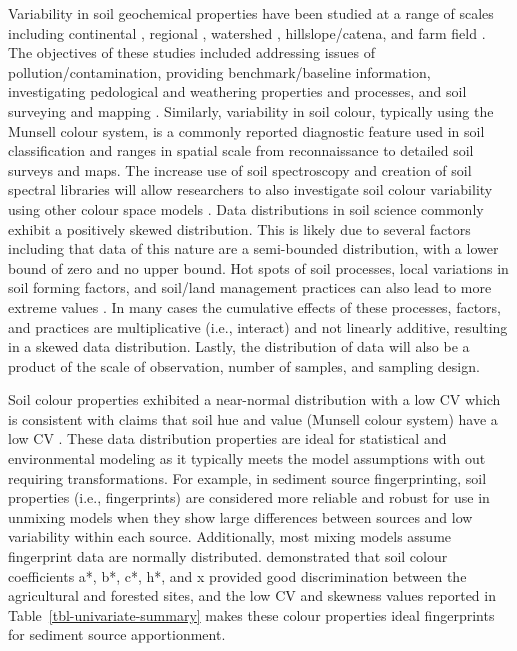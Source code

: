 \documentclass[
  number]{elsarticle}
\begin{document}
Variability in soil geochemical properties have been studied at a range
of scales including continental \citep{drew2010}, regional
\citep{rattenbury2018}, watershed \citep{nanos2012}, hillslope/catena,
and farm field \citep{sun2021a}. The objectives of these studies
included addressing issues of pollution/contamination, providing
benchmark/baseline information, investigating pedological and weathering
properties and processes, and soil surveying and mapping
\citep{wilson2008}. Similarly, variability in soil colour, typically
using the Munsell colour system, is a commonly reported diagnostic
feature used in soil classification and ranges in spatial scale from
reconnaissance to detailed soil surveys and maps. The increase use of
soil spectroscopy \citep{poppiel2022} and creation of soil spectral
libraries \citep[e.g.,][]{canadian} will allow researchers to also
investigate soil colour variability using other colour space models
\citep{viscarrarossel2006}. Data distributions in soil science commonly
exhibit a positively skewed distribution. This is likely due to several
factors including that data of this nature are a semi-bounded
distribution, with a lower bound of zero and no upper bound. Hot spots
of soil processes, local variations in soil forming factors, and
soil/land management practices can also lead to more extreme values
\citep[e.g.,][]{vidon2010}. In many cases the cumulative effects of
these processes, factors, and practices are multiplicative (i.e.,
interact) and not linearly additive, resulting in a skewed data
distribution. Lastly, the distribution of data will also be a product of
the scale of observation, number of samples, and sampling design.

Soil colour properties exhibited a near-normal distribution with a low
CV which is consistent with claims that soil hue and value (Munsell
colour system) have a low CV \citep{pennock2008}. These data
distribution properties are ideal for statistical and environmental
modeling as it typically meets the model assumptions with out requiring
transformations. For example, in sediment source fingerprinting, soil
properties (i.e., fingerprints) are considered more reliable and robust
for use in unmixing models when they show large differences between
sources and low variability within each source. Additionally, most
mixing models assume fingerprint data are normally distributed.
\citep{lunamiño2024} demonstrated that soil colour coefficients a*, b*,
c*, h*, and x provided good discrimination between the agricultural and
forested sites, and the low CV and skewness values reported in
Table~\ref{tbl-univariate-summary} makes these colour properties ideal
fingerprints for sediment source apportionment.
\end{document}
